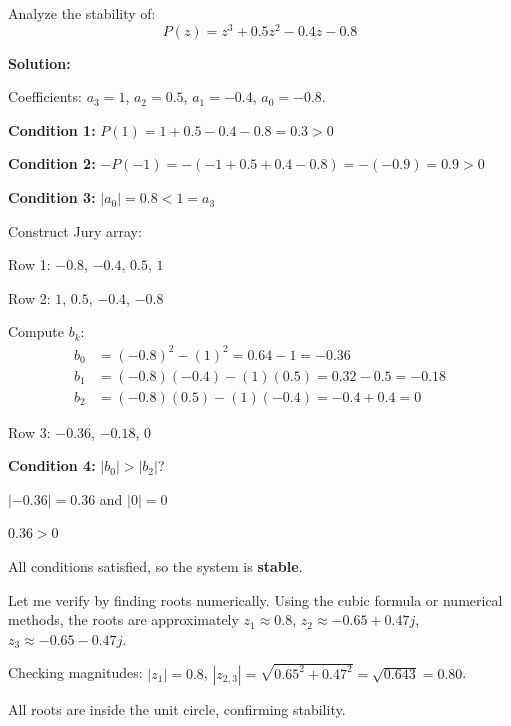 \begin{example}
\label{ex:jury_unstable}

Analyze the stability of:
\begin{equation}
P(z) = z^3 + 0.5z^2 - 0.4z - 0.8
\end{equation}

\textbf{Solution:}

Coefficients: $a_3 = 1$, $a_2 = 0.5$, $a_1 = -0.4$, $a_0 = -0.8$.

\textbf{Condition 1:} $P(1) = 1 + 0.5 - 0.4 - 0.8 = 0.3 > 0$ \checkmark

\textbf{Condition 2:} $-P(-1) = -(-1 + 0.5 + 0.4 - 0.8) = -(-0.9) = 0.9 > 0$ \checkmark

\textbf{Condition 3:} $|a_0| = 0.8 < 1 = a_3$ \checkmark

Construct Jury array:

Row 1: $-0.8$, $-0.4$, $0.5$, $1$

Row 2: $1$, $0.5$, $-0.4$, $-0.8$

Compute $b_k$:
\begin{align}
b_0 &= (-0.8)^2 - (1)^2 = 0.64 - 1 = -0.36 \\
b_1 &= (-0.8)(-0.4) - (1)(0.5) = 0.32 - 0.5 = -0.18 \\
b_2 &= (-0.8)(0.5) - (1)(-0.4) = -0.4 + 0.4 = 0
\end{align}

Row 3: $-0.36$, $-0.18$, $0$

\textbf{Condition 4:} $|b_0| > |b_2|$?

$|-0.36| = 0.36$ and $|0| = 0$

$0.36 > 0$ \checkmark

All conditions satisfied, so the system is \textbf{stable}.

Let me verify by finding roots numerically. Using the cubic formula or numerical methods, the roots are approximately $z_1 \approx 0.8$, $z_2 \approx -0.65 + 0.47j$, $z_3 \approx -0.65 - 0.47j$.

Checking magnitudes: $|z_1| = 0.8$, $|z_{2,3}| = \sqrt{0.65^2 + 0.47^2} = \sqrt{0.643} = 0.80$.

All roots are inside the unit circle, confirming stability.
\end{example}

